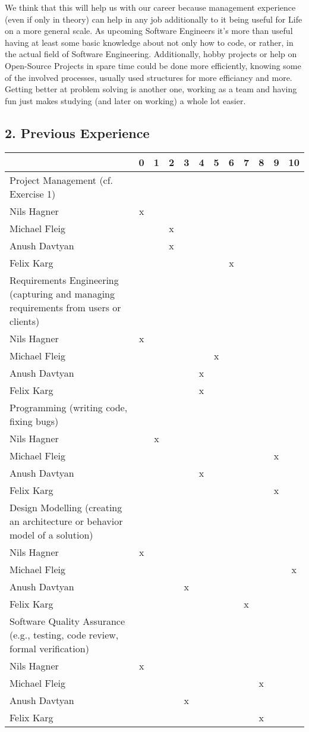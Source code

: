 \documentclass{scrartcl}
\begin{document}
We think that this will help us with our career because management experience (even if only in theory) can help in any job additionally to it being useful for Life on a more general scale.
As upcoming Software Engineers it's more than useful having at least some basic knowledge about not only how to code, or rather, in the actual field of Software Engineering.
Additionally, hobby projects or help on Open-Source Projects in spare time could be done more efficiently, knowing some of the involved processes, usually used structures for more efficiancy and more.
Getting better at problem solving is another one, working as a team and having fun just makes studying (and later on working) a whole lot easier.

\subsection*{2. Previous Experience}


\begin{tabular}{| p{10cm} | c | c | c | c | c | c | c | c | c | c | c |}
	\hline
	& 0& 1& 2& 3& 4& 5& 6& 7& 8& 9& 10\\
	\hline
	Project Management (cf. Exercise 1) \\
	\hline
	Nils Hagner &x&&&&&&&&&&\\ \hline
	Michael Fleig &&&x&&&&&&&&\\ \hline
	Anush Davtyan &&&x&&&&&&&&\\ \hline
	Felix Karg &&&&&&&x&&&&\\ \hline
	Requirements Engineering (capturing and managing requirements from users or clients)\\
	\hline
	Nils Hagner &x&&&&&&&&&&\\ \hline
	Michael Fleig &&&&&&x&&&&&\\ \hline
	Anush Davtyan &&&&&x&&&&&&\\ \hline
	Felix Karg &&&&&x&&&&&&\\ \hline
	Programming (writing code, fixing bugs)\\
	\hline
	Nils Hagner &&x&&&&&&&&&\\ \hline
	Michael Fleig &&&&&&&&&&x&\\ \hline
	Anush Davtyan &&&&&x&&&&&&\\ \hline
	Felix Karg &&&&&&&&&&x&\\ \hline
	Design Modelling (creating an architecture or behavior model of a solution)\\
	\hline
	Nils Hagner &x&&&&&&&&&&\\ \hline
	Michael Fleig &&&&&&&&&&&x\\ \hline
	Anush Davtyan &&&&x&&&&&&&\\ \hline
	Felix Karg &&&&&&&&x&&&\\ \hline
	Software Quality Assurance (e.g., testing, code review, formal verification)\\
	\hline
	Nils Hagner &x&&&&&&&&&&\\ \hline
	Michael Fleig &&&&&&&&&x&&\\ \hline
	Anush Davtyan &&&&x&&&&&&&\\ \hline
	Felix Karg &&&&&&&&&x&&\\ \hline
\end{tabular}
\end{document}
